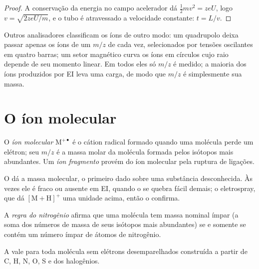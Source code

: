 \begin{proof}
A conservação da energia no campo acelerador dá $\tfrac12mv^2 = zeU$, logo $v = \sqrt{2zeU/m}$, e
o tubo é atravessado a velocidade constante: $t = L/v$.
\end{proof}

Outros analisadores classificam os íons de outro modo: um quadrupolo deixa passar apenas os íons de um
$m/z$ de cada vez, selecionados por tensões oscilantes em quatro barras; um setor magnético curva os íons
em círculos cujo raio depende de seu momento linear. Em todos eles só $m/z$ é medido; a maioria dos íons
produzidos por EI leva uma carga, de modo que $m/z$ é simplesmente sua massa.

\section{O íon molecular}

\begin{definition}\label{def:b2:mass-spec-atomic:molecular-ion}
O \emph{íon molecular} $\mathrm M^{+\bullet}$ é o cátion radical formado quando uma
molécula perde um elétron; seu $m/z$ é a massa molar da molécula formada pelos isótopos mais
abundantes. Um \emph{íon fragmento} provém do íon molecular pela ruptura de
ligações.
\end{definition}

O  dá a massa molecular, o primeiro dado sobre uma substância desconhecida. Às vezes ele é
fraco ou ausente em EI, quando o  se quebra fácil demais; o eletrospray, que dá $[\mathrm M +
\mathrm H]^+$ uma unidade acima, então o confirma.

\begin{definition}\label{def:b2:mass-spec-atomic:nitrogen-rule}
A \emph{regra do nitrogênio} afirma que uma molécula tem massa nominal ímpar (a soma
dos números de massa de seus isótopos mais abundantes) se e somente se contém um número ímpar de átomos
de nitrogênio.
\end{definition}

\begin{proposition}\label{prop:b2:mass-spec-atomic:nitrogen-rule}
A  vale para toda molécula sem elétrons desemparelhados construída a partir de C, H,
N, O, S e dos halogênios.
\end{proposition}


